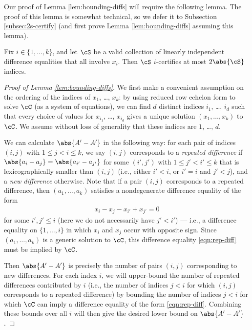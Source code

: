 Our proof of Lemma \ref{lem:bounding-diffs} will require the following lemma. The proof of this lemma is somewhat technical, so we defer it to Subsection \ref{subsec:2s-certify} (and first prove Lemma \ref{lem:bounding-diffs} assuming this lemma). 

\begin{lemma}\label{lem:2s-certify}
    Fix $i \in \{1, \ldots, k\}$, and let $\cS$ be a valid collection of linearly independent difference equalities that all involve $x_i$. Then $\cS$ $i$-certifies at most $2\abs{\cS}$ indices. 
\end{lemma}

\begin{proof}[Proof of Lemma \ref{lem:bounding-diffs}]
    We first make a convenient assumption on the ordering of the indices of $x_1$, \ldots, $x_k$: by using reduced row echelon form to solve $\cC$ (as a system of equations), we can find $d$ distinct indices $i_1$, \ldots, $i_d$ such that every choice of values for $x_{i_1}$, \ldots, $x_{i_d}$ gives a unique solution $(x_1, \ldots, x_k)$ to $\cC$. We assume without loss of generality that these indices are $1$, \ldots, $d$. 

    We can calculate $\abs{A' - A'}$ in the following way: for each pair of indices $(i, j)$ with $1 \leq j < i \leq k$, we say $(i, j)$ corresponds to a \emph{repeated difference} if $\abs{a_i - a_j} = \abs{a_{i'} - a_{j'}}$ for some $(i', j')$ with $1 \leq j' < i' \leq k$ that is lexicographically smaller than $(i, j)$ (i.e., either $i' < i$, or $i' = i$ and $j' < j$), and a \emph{new difference} otherwise. Note that if a pair $(i, j)$ corresponds to a repeated difference, then $(a_1, \ldots, a_k)$ satisfies a nondegenerate difference equality of the form 
    \begin{align}
        x_i - x_j - x_{i'} + x_{j'} = 0\label{eqn:rep-diff}
    \end{align} 
    for some $i', j' \leq i$ (here we do not necessarily have $j' < i'$) --- i.e., a difference equality on $\{1, \ldots, i\}$ in which $x_i$ and $x_j$ occur with opposite sign. Since $(a_1, \ldots, a_k)$ is a generic solution to $\cC$, this difference equality \eqref{eqn:rep-diff} must be implied by $\cC$.
    
    Then $\abs{A' - A'}$ is precisely the number of pairs $(i, j)$ corresponding to new differences. For each index $i$, we will upper-bound the number of repeated differences contributed by $i$ (i.e., the number of indices $j < i$ for which $(i, j)$ corresponds to a repeated difference) by bounding the number of indices $j < i$ for which $\cC$ can imply a difference equality of the form \eqref{eqn:rep-diff}. Combining these bounds over all $i$ will then give the desired lower bound on $\abs{A' - A'}$. 
    

\end{proof}
